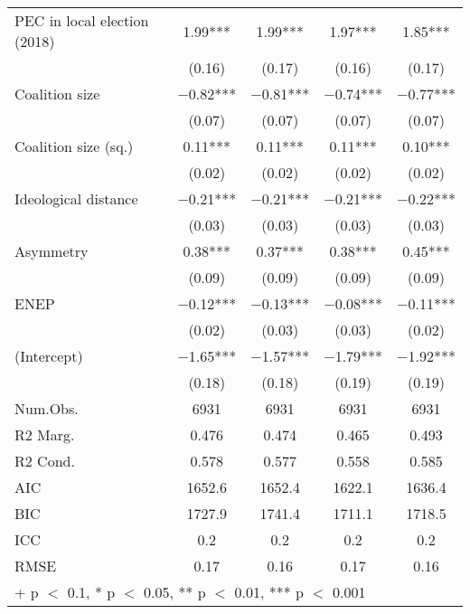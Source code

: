 \documentclass[fignum,12pt,titlepage]{article}
\begin{document}
\begin{longtable}[H]{lcccc}
PEC in local election (2018) & \num{1.99}*** & \num{1.99}*** & \num{1.97}*** & \num{1.85}***\\
 & (\num{0.16}) & (\num{0.17}) & (\num{0.16}) & (\num{0.17})\\
Coalition size & \num{-0.82}*** & \num{-0.81}*** & \num{-0.74}*** & \num{-0.77}***\\
 & (\num{0.07}) & (\num{0.07}) & (\num{0.07}) & (\num{0.07})\\
Coalition size (sq.) & \num{0.11}*** & \num{0.11}*** & \num{0.11}*** & \num{0.10}***\\
 & (\num{0.02}) & (\num{0.02}) & (\num{0.02}) & (\num{0.02})\\
Ideological distance & \num{-0.21}*** & \num{-0.21}*** & \num{-0.21}*** & \num{-0.22}***\\
 & (\num{0.03}) & (\num{0.03}) & (\num{0.03}) & (\num{0.03})\\
Asymmetry & \num{0.38}*** & \num{0.37}*** & \num{0.38}*** & \num{0.45}***\\
 & (\num{0.09}) & (\num{0.09}) & (\num{0.09}) & (\num{0.09})\\
ENEP & \num{-0.12}*** & \num{-0.13}*** & \num{-0.08}*** & \num{-0.11}***\\
 & (\num{0.02}) & (\num{0.03}) & (\num{0.03}) & (\num{0.02})\\
(Intercept) & \num{-1.65}*** & \num{-1.57}*** & \num{-1.79}*** & \num{-1.92}***\\
 & (\num{0.18}) & (\num{0.18}) & (\num{0.19}) & (\num{0.19})\\
\midrule
Num.Obs. & \num{6931} & \num{6931} & \num{6931} & \num{6931}\\
R2 Marg. & \num{0.476} & \num{0.474} & \num{0.465} & \num{0.493}\\
R2 Cond. & \num{0.578} & \num{0.577} & \num{0.558} & \num{0.585}\\
AIC & \num{1652.6} & \num{1652.4} & \num{1622.1} & \num{1636.4}\\
BIC & \num{1727.9} & \num{1741.4} & \num{1711.1} & \num{1718.5}\\
ICC & \num{0.2} & \num{0.2} & \num{0.2} & \num{0.2}\\
RMSE & \num{0.17} & \num{0.16} & \num{0.17} & \num{0.16}\\
\bottomrule
\multicolumn{5}{l}{\rule{0pt}{1em}+ p $<$ 0.1, * p $<$ 0.05, ** p $<$ 0.01, *** p $<$ 0.001}\\

\end{longtable}
\end{document}
